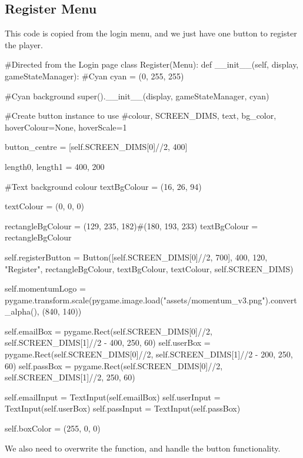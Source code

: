\subsection{Register Menu}

This code is copied from the login menu, and we just have one button to register the player.

\begin{mpy}
#Directed from the Login page
class Register(Menu):
    def __init__(self, display, gameStateManager):
        #Cyan
        cyan = (0, 255, 255)

        #Cyan background
        super().__init__(display, gameStateManager, cyan)

        #Create button instance to use
        #colour, SCREEN_DIMS, text, bg_color, hoverColour=None, hoverScale=1

        button_centre = [self.SCREEN_DIMS[0]//2, 400]

        length0, length1 = 400, 200

        #Text background colour
        textBgColour = (16, 26, 94)

        textColour = (0, 0, 0)

        rectangleBgColour = (129, 235, 182)#(180, 193, 233)
        textBgColour = rectangleBgColour

        self.registerButton = Button([self.SCREEN_DIMS[0]//2, 700], 400, 120, "Register", rectangleBgColour, textBgColour, textColour, self.SCREEN_DIMS)

        self.momentumLogo = pygame.transform.scale(pygame.image.load("assets/momentum_v3.png").convert_alpha(), (840, 140))

        self.emailBox = pygame.Rect(self.SCREEN_DIMS[0]//2, self.SCREEN_DIMS[1]//2 - 400, 250, 60)
        self.userBox = pygame.Rect(self.SCREEN_DIMS[0]//2, self.SCREEN_DIMS[1]//2 - 200, 250, 60)
        self.passBox = pygame.Rect(self.SCREEN_DIMS[0]//2, self.SCREEN_DIMS[1]//2, 250, 60)

        self.emailInput = TextInput(self.emailBox)
        self.userInput = TextInput(self.userBox)
        self.passInput = TextInput(self.passBox)

        self.boxColor = (255, 0, 0)
\end{mpy}

We also need to overwrite the  function, and handle the button functionality.

